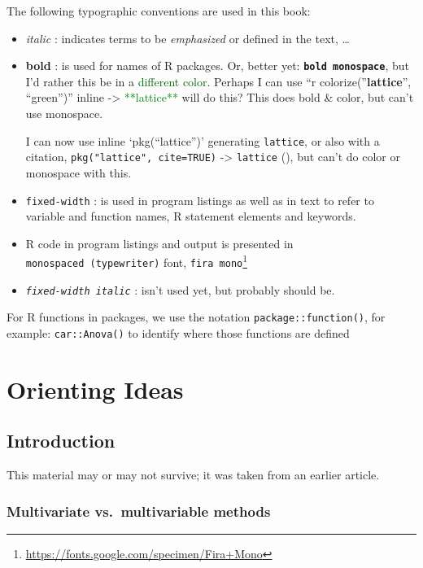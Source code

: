 \documentclass[
  letterpaper,
  10pt,
  krantz2]{krantz}
\providecommand{\href}[2]{#2\footnote{\url{#1}}}
\begin{document}

The following typographic conventions are used in this book:

\begin{itemize}
\item
  \emph{italic} : indicates terms to be \emph{emphasized} or defined in
  the text, \ldots{}
\item
  \textbf{bold} : is used for names of R packages. Or, better yet:
  \textbf{\texttt{bold\ monospace}}, but I'd rather this be in a
  \textcolor{darkgreen}{different color}. Perhaps I can use ``r
  colorize(''\textbf{lattice}'', ``green'')'' inline -\textgreater{}
  \textcolor{green}{**lattice**} will do this? This does bold \& color,
  but can't use monospace.

  I can now use inline `pkg(``lattice'')' generating \texttt{lattice},
  or also with a citation, \texttt{pkg("lattice",\ cite=TRUE)}
  -\textgreater{} \texttt{lattice} (), but can't do color or monospace with this.
\item
  \texttt{fixed-width} : is used in program listings as well as in text
  to refer to variable and function names, R statement elements and
  keywords.
\item
  R code in program listings and output is presented in
  \texttt{monospaced\ (typewriter)} font,
  \href{https://fonts.google.com/specimen/Fira+Mono}{\texttt{fira\ mono}}
\item
  \emph{\texttt{fixed-width\ italic}} : isn't used yet, but probably
  should be.
\end{itemize}

For R functions in packages, we use the notation
\texttt{package::function()}, for example: \texttt{car::Anova()} to
identify where those functions are defined

\mainmatter

\part{Orienting Ideas}

\chapter{Introduction}\label{sec-introduction}

This material may or may not survive; it was taken from an earlier
article.

\section{Multivariate vs.~multivariable
methods}\label{multivariate-vs.-multivariable-methods}
\end{document}
